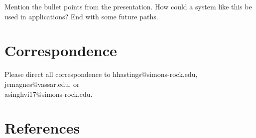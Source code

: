\documentclass[
    11pt,
]{article}
\begin{document}
Mention the bullet points from the presentation.  How could a system like this be used in applications?  End with some future paths.

\section{Correspondence}\label{correspondence}
\makeatletter
Please direct all correspondence to hhastings@simons-rock.edu,
jemagnes@vassar.edu, or\\asinghvi17@simons-rock.edu.
\makeatother

\section{References}


\end{document}
